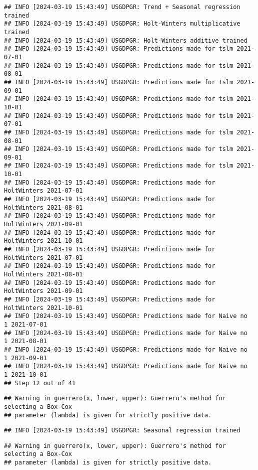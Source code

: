 \documentclass[
]{article}
\begin{document}
\begin{verbatim}
## INFO [2024-03-19 15:43:49] USGDPGR: Trend + Seasonal regression trained
## INFO [2024-03-19 15:43:49] USGDPGR: Holt-Winters multiplicative trained
## INFO [2024-03-19 15:43:49] USGDPGR: Holt-Winters additive trained
## INFO [2024-03-19 15:43:49] USGDPGR: Predictions made for tslm 2021-07-01
## INFO [2024-03-19 15:43:49] USGDPGR: Predictions made for tslm 2021-08-01
## INFO [2024-03-19 15:43:49] USGDPGR: Predictions made for tslm 2021-09-01
## INFO [2024-03-19 15:43:49] USGDPGR: Predictions made for tslm 2021-10-01
## INFO [2024-03-19 15:43:49] USGDPGR: Predictions made for tslm 2021-07-01
## INFO [2024-03-19 15:43:49] USGDPGR: Predictions made for tslm 2021-08-01
## INFO [2024-03-19 15:43:49] USGDPGR: Predictions made for tslm 2021-09-01
## INFO [2024-03-19 15:43:49] USGDPGR: Predictions made for tslm 2021-10-01
## INFO [2024-03-19 15:43:49] USGDPGR: Predictions made for HoltWinters 2021-07-01
## INFO [2024-03-19 15:43:49] USGDPGR: Predictions made for HoltWinters 2021-08-01
## INFO [2024-03-19 15:43:49] USGDPGR: Predictions made for HoltWinters 2021-09-01
## INFO [2024-03-19 15:43:49] USGDPGR: Predictions made for HoltWinters 2021-10-01
## INFO [2024-03-19 15:43:49] USGDPGR: Predictions made for HoltWinters 2021-07-01
## INFO [2024-03-19 15:43:49] USGDPGR: Predictions made for HoltWinters 2021-08-01
## INFO [2024-03-19 15:43:49] USGDPGR: Predictions made for HoltWinters 2021-09-01
## INFO [2024-03-19 15:43:49] USGDPGR: Predictions made for HoltWinters 2021-10-01
## INFO [2024-03-19 15:43:49] USGDPGR: Predictions made for Naive no  1 2021-07-01
## INFO [2024-03-19 15:43:49] USGDPGR: Predictions made for Naive no  1 2021-08-01
## INFO [2024-03-19 15:43:49] USGDPGR: Predictions made for Naive no  1 2021-09-01
## INFO [2024-03-19 15:43:49] USGDPGR: Predictions made for Naive no  1 2021-10-01
## Step 12 out of 41
\end{verbatim}

\begin{verbatim}
## Warning in guerrero(x, lower, upper): Guerrero's method for selecting a Box-Cox
## parameter (lambda) is given for strictly positive data.
\end{verbatim}

\begin{verbatim}
## INFO [2024-03-19 15:43:49] USGDPGR: Seasonal regression trained
\end{verbatim}

\begin{verbatim}
## Warning in guerrero(x, lower, upper): Guerrero's method for selecting a Box-Cox
## parameter (lambda) is given for strictly positive data.
\end{verbatim}
\end{document}
